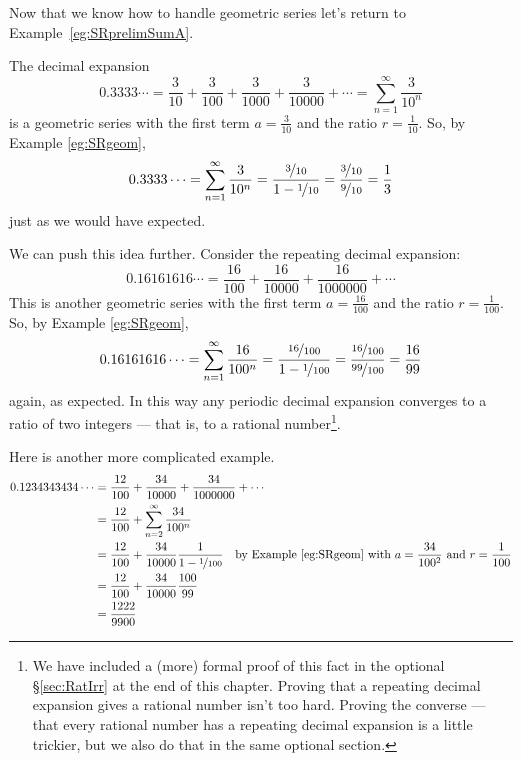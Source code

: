 Now that we know how to handle geometric series let's return to Example~\ref{eg:SRprelimSumA}.
\begin{eg}\label{eg:SRgeomB}
The decimal expansion
\begin{equation*}
0.3333\cdots
=\frac{3}{10}+\frac{3}{100}+\frac{3}{1000}+\frac{3}{10000}+\cdots
=\sum_{n=1}^\infty\frac{3}{10^n}
\end{equation*}
is a geometric series with the first term $a=\frac{3}{10}$ and the ratio
$r=\frac{1}{10}$. So, by Example \ref{eg:SRgeom},
\begin{equation*}
0.3333\cdots
=\sum_{n=1}^\infty\frac{3}{10^n}
=\frac{\nicefrac{3}{10}}{1-\nicefrac{1}{10}}
=\frac{\nicefrac{3}{10}}{\nicefrac{9}{10}}
=\frac{1}{3}
\end{equation*}
just as we would have expected.

We can push this idea further. Consider the repeating decimal expansion:
\begin{equation*}
0.16161616\cdots
=\frac{16}{100}+\frac{16}{10000}+\frac{16}{1000000}+\cdots
\end{equation*}
This is another geometric series with the first term $a=\frac{16}{100}$
and the ratio $r=\frac{1}{100}$. So, by Example \ref{eg:SRgeom},
\begin{equation*}
0.16161616\cdots
=\sum_{n=1}^\infty\frac{16}{100^n}
=\frac{\nicefrac{16}{100}}{1-\nicefrac{1}{100}}
=\frac{\nicefrac{16}{100}}{\nicefrac{99}{100}}
=\frac{16}{99}
\end{equation*}
again, as expected. In this way any periodic decimal expansion converges
to a ratio of two integers --- that is, to a rational number\footnote{We
have included a (more) formal proof of this fact in the optional
\S \ref{sec:RatIrr}
at the end of this chapter. Proving that a repeating decimal expansion
gives a rational number isn't too hard. Proving the converse --- that
every rational number has a repeating decimal expansion is a
little trickier, but we also do that in the same optional section.}.

Here is another more complicated example.
\begin{align*}
0.1234343434\cdots
&=\frac{12}{100}+\frac{34}{10000}+\frac{34}{1000000}+\cdots \\
&=\frac{12}{100}+\sum_{n=2}^\infty\frac{34}{100^n} \\
&=\frac{12}{100}+\frac{34}{10000}\frac{1}{1-\nicefrac{1}{100}}
     \quad\text{by Example \ref{eg:SRgeom} with $a=\frac{34}{100^2}$
and $r=\frac{1}{100}$} \\
&=\frac{12}{100}+\frac{34}{10000}\frac{100}{99} \\
&=\frac{1222}{9900}
\end{align*}

\end{eg}

